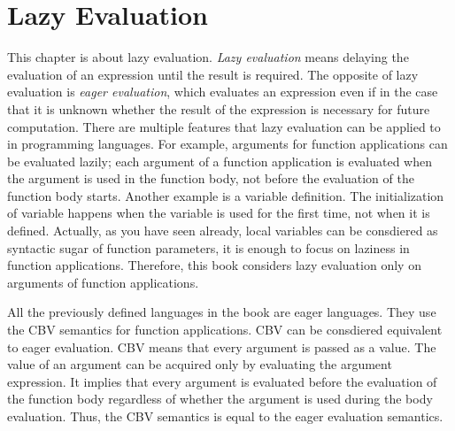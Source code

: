 \setchapterpreamble[u]{\margintoc}
\chapter{Lazy Evaluation}

\renewcommand{\plang}{\textsf{FAE}\xspace}
\renewcommand{\lang}{\textsf{LFAE}\xspace}

This chapter is about lazy evaluation. \textit{Lazy evaluation} means delaying the evaluation of an expression until the result
is required. The opposite of lazy evaluation is \textit{eager
evaluation}, which evaluates an expression even if in
the case that it is unknown whether the result of the expression is necessary
for future computation. There are multiple features that lazy evaluation can be
applied to in programming languages. For example, arguments for function
applications can be evaluated lazily; each argument of a function application is
evaluated when the argument is used in the function body, not before the
evaluation of the function body starts. Another example is a variable
definition. The initialization of variable happens when the variable is
used for the first time, not when it is defined. Actually, as you have seen
already, local variables can be consdiered as syntactic sugar of function
parameters, it is enough to focus on laziness in function applications.
Therefore, this book considers lazy evaluation only on arguments of function
applications.

All the previously defined languages in the book are eager languages. They use
the CBV semantics for function applications. CBV can be consdiered equivalent to
eager evaluation. CBV means that every argument is passed as a value. The value
of an argument can be acquired only by evaluating the argument expression. It
implies that every argument is evaluated before the evaluation of the function
body regardless of whether the argument is used during the body evaluation.
Thus, the CBV semantics is equal to the eager evaluation semantics.

